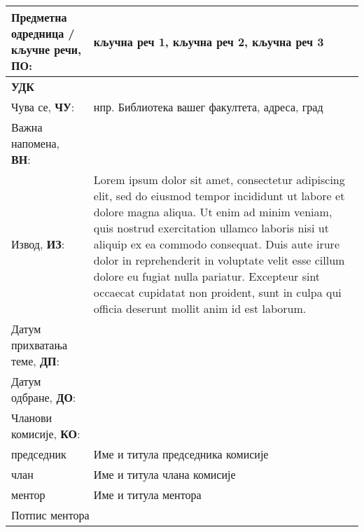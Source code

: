 {\begin{longtable}{| p{} | p{} |}
        Предметна одредница / кључне речи, \textbf{ПО}: & кључна реч 1, кључна реч 2, кључна реч 3 \\ \hline
        \textbf{УДК}                                    & \\ \hline
        Чува се, \textbf{ЧУ}:                           & нпр. Библиотека вашег факултета, адреса, град \\ \hline
        Важна напомена, \textbf{ВН}:                    & \\ \hline
        Извод, \textbf{ИЗ}:                             & Lorem ipsum dolor sit amet, consectetur adipiscing elit, sed do eiusmod tempor incididunt ut labore et dolore magna aliqua. Ut enim ad minim veniam, quis nostrud exercitation ullamco laboris nisi ut aliquip ex ea commodo consequat. Duis aute irure dolor in reprehenderit in voluptate velit esse cillum dolore eu fugiat nulla pariatur. Excepteur sint occaecat cupidatat non proident, sunt in culpa qui officia deserunt mollit anim id est laborum.    \\ \hline
        Датум прихватања теме, \textbf{ДП}:             & \\ \hline
        Датум одбране, \textbf{ДО}:                     & \\ \hline
        Чланови комисије, \textbf{КО}:                  & \\ \hline
        \quad председник                                & Име и титула председника комисије \\ \hline 
        \quad члан                                      & Име и титула члана комисије \\ \hline 
        \quad ментор                                    & Име и титула ментора \\ \hline 
        \multicolumn{2}{|l|}{Потпис ментора} \\[25pt] \hline
    \end{longtable}
}

